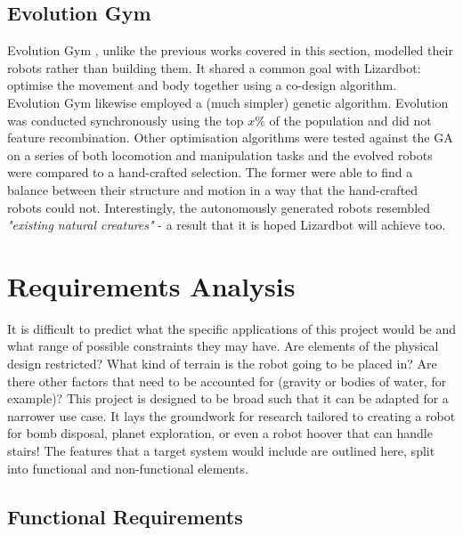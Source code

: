 \documentclass{article}
\begin{document}
\subsection{Evolution Gym}
\label{sec:Evolution Gym}
Evolution Gym , unlike the previous works covered in this section, modelled their robots rather than building them. It shared a common goal with Lizardbot: optimise the movement and body together using a co-design algorithm. \\

Evolution Gym likewise employed a (much simpler) genetic algorithm. Evolution was conducted synchronously using the top $x\%$ of the population and did not feature recombination. Other optimisation algorithms were tested against the GA on a series of both locomotion and manipulation tasks and the evolved robots were compared to a hand-crafted selection. The former were able to find a balance between their structure and motion in a way that the hand-crafted robots could not. Interestingly, the autonomously generated robots resembled \textit{"existing natural creatures"} - a result that it is hoped Lizardbot will achieve too.

\newpage
\section{Requirements Analysis}
\label{sec:Requirements Analysis}
%
It is difficult to predict what the specific applications of this project would be and what range of possible constraints they may have. Are elements of the physical design restricted? What kind of terrain is the robot going to be placed in? Are there other factors that need to be accounted for (gravity or bodies of water, for example)? This project is designed to be broad such that it can be adapted for a narrower use case. It lays the groundwork for research tailored to creating a robot for bomb disposal, planet exploration, or even a robot hoover that can handle stairs!
The features that a target system would include are outlined here, split into functional and non-functional elements.

\subsection{Functional Requirements}
\label{sec:Functional Requirements}
\end{document}
